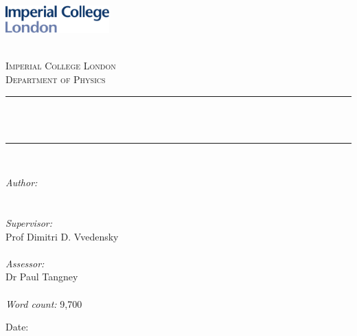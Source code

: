 \begin{titlepage}

\newcommand{\HRule}{\rule{\linewidth}{0.5mm}} %



\includegraphics[width = 4cm]{./figures/imperial}\\[0.5cm] 

\begin{center} %

\textsc{\LARGE \reporttype}\\[1.5cm] 
\textsc{\Large Imperial College London}\\[0.5cm] 
\textsc{\large Department of Physics}\\[0.5cm] 

\HRule \\[0.4cm]
{ \huge \bfseries \reporttitle}\\ %
\HRule \\[1.5cm]
\end{center}

\begin{flushleft} \large
\textit{Author:}\\
\reportauthor\\
\hfill\\
\textit{Supervisor:}\\
Prof Dimitri D. Vvedensky\\
\hfill\\
\textit{Assessor:}\\
Dr Paul Tangney\\
\hfill\\
\textit{Word count:} 9,700
\end{flushleft}
\vspace{2cm}
\makeatletter
Date: \@date 

\vfill %



\makeatother


\end{titlepage}

